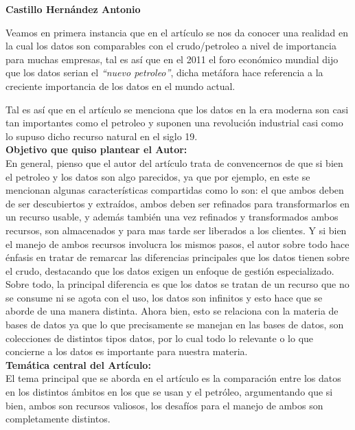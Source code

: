 \begin{center}
    \textbf{Castillo Hernández Antonio}
\end{center}

Veamos en primera instancia que en el artículo se nos da conocer una realidad en la cual los datos son comparables con el crudo/petroleo a nivel de importancia para muchas empresas, tal es así que en el 2011 el foro económico mundial dijo que los datos serian el \textit{“nuevo petroleo”}, dicha metáfora hace referencia a la creciente importancia de los datos en el mundo actual. 

Tal es así que en el artículo se menciona que los datos en la era moderna son casi tan importantes como el petroleo y suponen una revolución industrial casi como lo supuso dicho recurso natural en el siglo 19.\\

\textbf{Objetivo que quiso plantear el Autor:}\\

En general, pienso que el autor del artículo trata de convencernos de que si bien el petroleo y los datos son algo parecidos, ya que por ejemplo, en este se mencionan algunas características compartidas como lo son: el que ambos deben de ser descubiertos y extraídos, ambos deben ser refinados para transformarlos en un recurso usable, y además también una vez refinados y transformados ambos recursos, son almacenados y para mas tarde ser liberados a los clientes. Y si bien el manejo de ambos recursos involucra los mismos pasos, el autor sobre todo hace énfasis en tratar de remarcar las diferencias principales que los datos tienen sobre el crudo, destacando que los datos exigen un enfoque de gestión especializado. Sobre todo, la principal diferencia es que los datos se tratan de un recurso que no se consume ni se agota con el uso, los datos son infinitos y esto hace que se aborde de una manera distinta. Ahora bien, esto se relaciona con la materia de bases de datos ya que lo que precisamente se manejan en las bases de datos, son colecciones de distintos tipos datos, por lo cual todo lo relevante o lo que concierne a los datos es importante para nuestra materia. \\

\textbf{Temática central del Artículo:} \\

El tema principal que se aborda en el artículo es la comparación entre los datos en los distintos ámbitos en los que se usan y el petróleo, argumentando que si bien, ambos son recursos valiosos, los desafíos para el manejo de ambos son completamente distintos.

